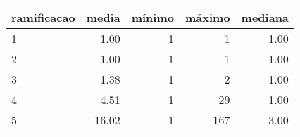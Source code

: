 \begin{table}[ht]
\centering
\begin{tabular}{lrrrr}
  \hline
ramificacao & media & mínimo & máximo & mediana \\ 
  \hline
1 & 1.00 &   1 &   1 & 1.00 \\ 
  2 & 1.00 &   1 &   1 & 1.00 \\ 
  3 & 1.38 &   1 &   2 & 1.00 \\ 
  4 & 4.51 &   1 &  29 & 1.00 \\ 
  5 & 16.02 &   1 & 167 & 3.00 \\ 
   \hline
\end{tabular}
\end{table}
